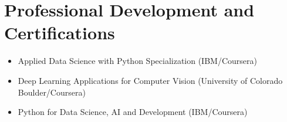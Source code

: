 \documentclass[11pt,letterpaper]{article}
\begin{document}
\section*{Professional Development and Certifications}
\begin{itemize}
    \item Applied Data Science with Python Specialization (IBM/Coursera)
    \item Deep Learning Applications for Computer Vision (University of Colorado Boulder/Coursera)
    \item Python for Data Science, AI and Development (IBM/Coursera)
\end{itemize}
\end{document}
